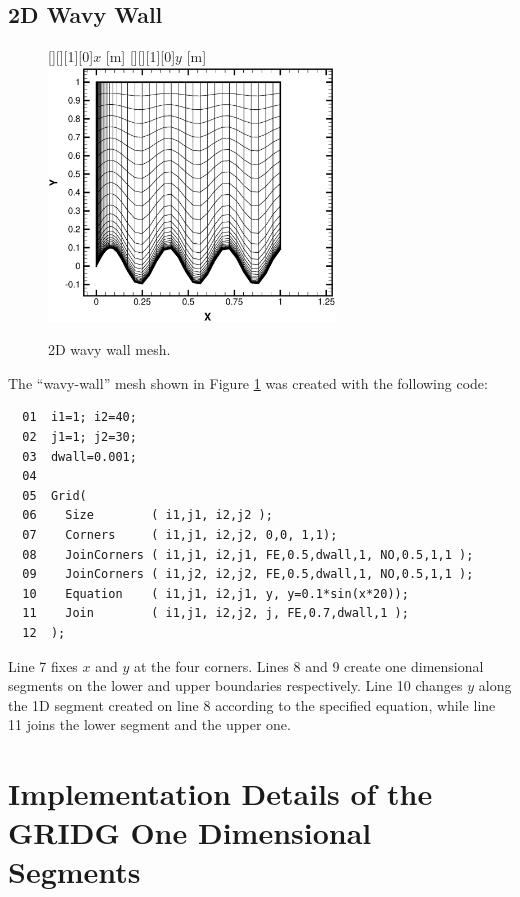 \documentclass{warpdoc}
\newcommand{\fontxfig}{\footnotesize\scalefont{0.918}}
\begin{document}
\subsection{2D Wavy Wall}

%
\begin{figure}[h]
\vspace{0.3cm}
   \fontxfig
   [][][1][0]{$x$ [m]}
   [][][1][0]{$y$ [m]}
   \includegraphics[width=3.0in]{grid.2D.sine.eps}
\caption{2D wavy wall mesh.}
\label{fig:gridsine}
\end{figure}
%
The ``wavy-wall'' mesh shown in Figure \ref{fig:gridsine} was created with
the following code:
%
\begin{verbatim}
  01  i1=1; i2=40;
  02  j1=1; j2=30;
  03  dwall=0.001;
  04
  05  Grid(
  06    Size        ( i1,j1, i2,j2 );
  07    Corners     ( i1,j1, i2,j2, 0,0, 1,1);
  08    JoinCorners ( i1,j1, i2,j1, FE,0.5,dwall,1, NO,0.5,1,1 );
  09    JoinCorners ( i1,j2, i2,j2, FE,0.5,dwall,1, NO,0.5,1,1 );
  10    Equation    ( i1,j1, i2,j1, y, y=0.1*sin(x*20));
  11    Join        ( i1,j1, i2,j2, j, FE,0.7,dwall,1 );
  12  );
\end{verbatim}
%
Line 7 fixes $x$ and $y$ at the four corners. Lines 8 and 9 create
one dimensional segments on the lower and upper boundaries respectively.
Line 10 changes $y$ along the 1D segment created on line 8 according
to the specified equation, while line 11 joins the lower segment
and the upper one.




\section{Implementation Details of the GRIDG One Dimensional Segments}
\end{document}
